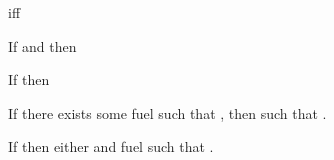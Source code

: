 \begin{lemma}
   \ltiSdsubtypeseen{\ltiSubtypeSeen{}}{\ltiEnv{}}{\ltiT{}}{\ltiS{}}
    iff
   \ltiisubtypeseen{\ltiSubtypeSeen{}}{\ltiEnv{}}{\ltiT{}}{\ltiS{}}
\end{lemma}

\begin{lemma}
  If \ltitSdjudgement{\ltiEnv{}}
                     {\ltiE{}}
                     {\ltiT{}}
                     {\ltiEp{}}
                     and
                     \ltiSdsubtypeseen{\varnothing}{\ltiEnv{}}{\ltiT{}}{\ltiS{}}
                     then
    \ltitjudgement{\ltiEnv{}}
                  {\ltiEp{}}
                  {\ltiS{}}
                  {\ltiEpp{}}
\end{lemma}

\begin{lemma}
  If \ltitjudgement{\ltiEnv{}}
                   {\ltiE{}}
                   {\ltiT{}}
                   {\ltiEp{}}
                  then
  \ltitSdjudgement{\ltiEnv{}}
                     {\ltiE{}}
                     {\ltiT{}}
                     {\ltiEp{}}
\end{lemma}

\begin{lemma}
  If there exists some fuel \ltiFuel{} such that
    \ltitSstkjudgementNoElab{\ltimakeCombinedThreadedEnv{\ltiFuel{}}{\ltiEmptyClosureCache}}
                      {\ltiEnv{}}
                      {}
                      {\ltiT{}}
                      {\ltimakeCombinedThreadedEnv{\ltiFuelp{}}{\ltiClosureCache{}}}
                      {},
                      then
    \ltitSdjudgement{\ltielimClosEnvLHS{\ltiClosureCache{}}{\ltiEnv{}}}
                    {}
                    {\ltiS{}}
                    {\ltiEp{}}
                    such that
                      \ltiisubtype{\ltielimClosEnvLHS{\ltiClosureCache{}}{\ltiEnv{}}}{\ltiS{}}{\ltielimClosTLHS{\varnothing}{\ltiClosureCache{}}{\ltiT{}}}.
\end{lemma}

\begin{lemma}
  If \ltitSdjudgement{\ltiEnv{}}
                     {\ltiE{}}
                     {\ltiT{}}
                     {\ltiEp{}}
                     then
    either
    and fuel \ltiFuel{}
    such that
    \ltitSstkjudgementNoElab{\ltimakeCombinedThreadedEnv{\ltiFuel{}}{\ltiEmptyClosureCache}}
                      {\ltiEnv{}}
                      {\ltiF{}}
                      {\ltiT{}}
                      {\ltimakeCombinedThreadedEnv{\ltiFuelp{}}{\ltiClosureCache{}}}
                      {\ltiFp{}}.
\end{lemma}

